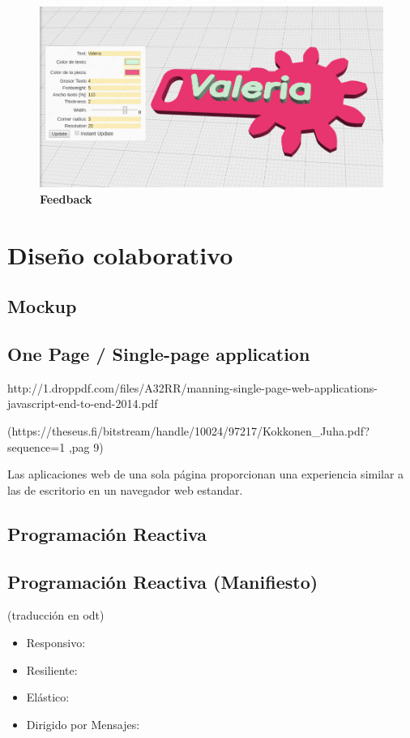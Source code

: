  \begin{figure}[h]
    \includegraphics[width=12cm]{Img/UX/feedback0.jpg}
    \centering
    \caption{\textbf{ \footnotesize{Feedback}}}
     \label{fig:comment}
\end{figure}



\section{Diseño colaborativo}

\subsection{Mockup}

\subsection{One Page / Single-page application}
http://1.droppdf.com/files/A32RR/manning-single-page-web-applications-javascript-end-to-end-2014.pdf

(https://theseus.fi/bitstream/handle/10024/97217/Kokkonen_Juha.pdf?sequence=1 ,pag 9)

Las aplicaciones web de una sola página proporcionan una experiencia similar a las de escritorio en un navegador web estandar. 

\subsection{Programación Reactiva}
\subsection{Programación Reactiva (Manifiesto)}
(traducción en odt)
\begin{itemize}
\item Responsivo:
\item Resiliente:
\item Elástico:
\item Dirigido por Mensajes:
\end{itemize}
